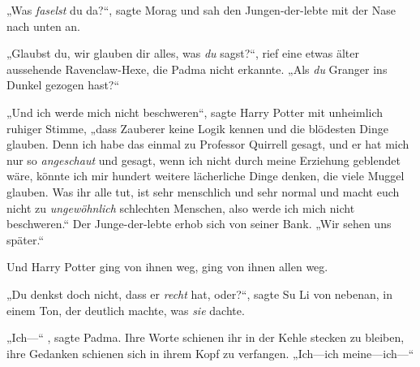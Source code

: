 „Was \emph{faselst} du da?“, sagte Morag und sah den Jungen-der-lebte mit der Nase nach unten an.

„Glaubst du, wir glauben dir alles, was \emph{du} sagst?“, rief eine etwas älter aussehende Ravenclaw-Hexe, die Padma nicht erkannte. „Als \emph{du} Granger ins Dunkel gezogen hast?“

„Und ich werde mich nicht beschweren“, sagte Harry Potter mit unheimlich ruhiger Stimme, „dass Zauberer keine Logik kennen und die blödesten Dinge glauben. Denn ich habe das einmal zu Professor Quirrell gesagt, und er hat mich nur so \emph{angeschaut} und gesagt, wenn ich nicht durch meine Erziehung geblendet wäre, könnte ich mir hundert weitere lächerliche Dinge denken, die viele Muggel glauben. Was ihr alle tut, ist sehr menschlich und sehr normal und macht euch nicht zu \emph{ungewöhnlich} schlechten Menschen, also werde ich mich nicht beschweren.“
Der Junge-der-lebte erhob sich von seiner Bank.
„Wir sehen uns später.“

Und Harry Potter ging von ihnen weg, ging von ihnen allen weg.

„Du denkst doch nicht, dass er \emph{recht} hat, oder?“, sagte Su Li von nebenan, in einem Ton, der deutlich machte, was \emph{sie} dachte.

„Ich—“ , sagte Padma. Ihre Worte schienen ihr in der Kehle stecken zu bleiben, ihre Gedanken schienen sich in ihrem Kopf zu verfangen. „Ich—ich meine—ich—“

